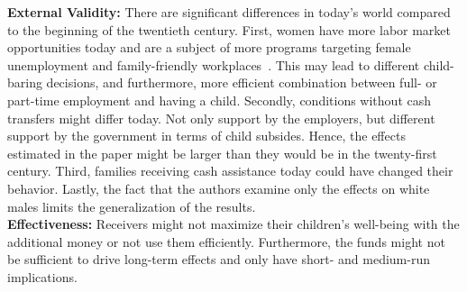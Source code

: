 \textbf{External Validity:} There are significant differences in today's world compared to the beginning of the twentieth century. First, women have more labor market opportunities today and are a subject of more programs targeting female unemployment and family-friendly workplaces~\citep{lauber2016helping}. This may lead to different child-baring decisions, and furthermore, more efficient combination between full- or part-time employment and having a child. Secondly, conditions without cash transfers might differ today. Not only support by the employers, but different support by the government in terms of child subsides. Hence, the effects estimated in the paper might be larger than they would be in the twenty-first century. Third, families receiving cash assistance today could have changed their behavior. Lastly, the fact that the authors examine only the effects on white males limits the generalization of the results.\\   
\textbf{Effectiveness:} Receivers might not maximize their children's well-being with the additional money or not use them efficiently. Furthermore, the funds might not be sufficient to drive long-term effects and only have short- and medium-run implications. 